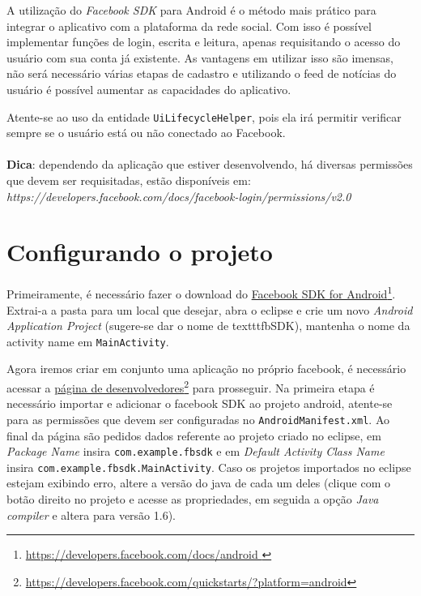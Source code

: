 \documentclass[a4paper,12pt,brazil,oneside]{book}
\begin{document}
	A utilização do \emph{Facebook SDK} para Android é o método mais prático para integrar o aplicativo com a plataforma da rede social. Com isso é possível implementar funções de login, escrita e leitura, apenas requisitando o acesso do usuário com sua conta já existente. As vantagens em utilizar isso são imensas, não será necessário várias etapas de cadastro e utilizando o feed de notícias do usuário é possível aumentar as capacidades do aplicativo.
		
	Atente-se ao uso da entidade \texttt{UiLifecycleHelper}, pois ela irá permitir verificar sempre se o usuário está ou não conectado ao Facebook.
	
	\begin{framed}
	\paragraph{}\textbf{Dica}: dependendo da aplicação que estiver desenvolvendo, há diversas permissões que devem ser requisitadas, estão disponíveis em: 
	\textit{https://developers.facebook.com/docs/facebook-login/permissions/v2.0}
	\end{framed}

\section{Configurando o projeto}

	Primeiramente, é necessário fazer o download do \href{https://developers.facebook.com/docs/android}{Facebook SDK for Android}\footnote{\href{https://developers.facebook.com/docs/android}{https://developers.facebook.com/docs/android }}.
	Extrai-a a pasta para um local que desejar, abra o eclipse e crie um novo \emph{Android Application Project} (sugere-se dar o nome de texttt{fbSDK}), mantenha o nome da activity name em \texttt{MainActivity}. 
	
	Agora iremos criar em conjunto uma aplicação no próprio facebook, é necessário acessar a \href{https://developers.facebook.com/quickstarts/?platform=android}{página de desenvolvedores}\footnote{\href{https://developers.facebook.com/quickstarts/?platform=android}{https://developers.facebook.com/quickstarts/?platform=android}} para prosseguir.
	Na primeira etapa é necessário importar e adicionar o facebook SDK ao projeto android, atente-se para as permissões que devem ser configuradas no \texttt{AndroidManifest.xml}. Ao final da página são pedidos dados referente ao projeto criado no eclipse, em \emph{Package Name} insira \texttt{com.example.fbsdk} e em \emph{Default Activity Class Name} insira \texttt{com.example.fbsdk.MainActivity}.
	Caso os projetos importados no eclipse estejam exibindo erro, altere a versão do java de cada um deles (clique com o botão direito no projeto e acesse as propriedades, em seguida a opção \emph{Java compiler} e altera para versão 1.6).
	
\end{document}
